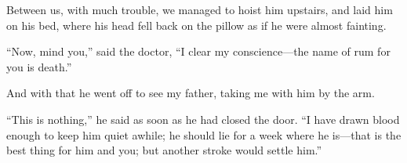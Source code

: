 Between us, with much trouble, we managed to hoist him upstairs, and laid him on his bed, where his head fell back on the pillow as if he were almost fainting.

\enquote{Now, mind you,} said the doctor, \enquote{I clear my conscience---the name of rum for you is death.}

And with that he went off to see my father, taking me with him by the arm.

\enquote{This is nothing,} he said as soon as he had closed the door. \enquote{I have drawn blood enough to keep him quiet awhile; he should lie for a week where he is---that is the best thing for him and you; but another stroke would settle him.}